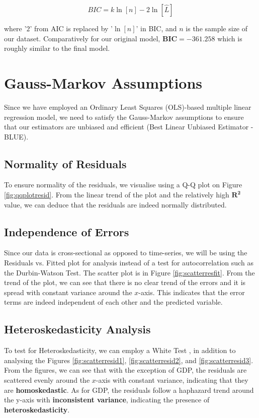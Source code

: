 \documentclass{article}
\begin{document}
\begin{equation}
    BIC = k\ln{[n]} - 2\ln{[\hat{L}]}
\end{equation}

\noindent where '$2$' from AIC is replaced by '$\ln{[n]}$' in BIC, and $n$ is the sample size of our dataset. Comparatively for our original model, $\bm{BIC} = -361.258$ which is roughly similar to the final model.  

\section{Gauss-Markov Assumptions}
Since we have employed an Ordinary Least Squares (OLS)-based multiple linear regression model, we need to satisfy the Gauss-Markov assumptions \cite{GaussMarkov} to ensure that our estimators are unbiased and efficient (Best Linear Unbiased Estimator - BLUE).

\subsection{Normality of Residuals}
To ensure normality of the residuals, we visualise using a Q-Q plot on Figure \ref{fig:qqplotresid}. From the linear trend of the plot and the relatively high $\bm{R^2}$ value, we can deduce that the residuals are indeed normally distributed.

\subsection{Independence of Errors}
Since our data is cross-sectional as opposed to time-series, we will be using the Residuals vs. Fitted plot for analysis instead of a test for autocorrelation such as the Durbin-Watson Test. The scatter plot is in Figure \ref{fig:scatterresfit}. From the trend of the plot, we can see that there is no clear trend of the errors and it is spread with constant variance around the $x$-axis. This indicates that the error terms are indeed independent of each other and the predicted variable.

\subsection{Heteroskedasticity Analysis}\label{Hetero}
To test for Heteroskedasticity, we can employ a White Test \cite{heteroskedasticity}, in addition to analysing the Figures \ref{fig:scatterresid1}, \ref{fig:scatterresid2}, and \ref{fig:scatterresid3}. From the figures, we can see that with the exception of GDP, the residuals are scattered evenly around the $x$-axis with constant variance, indicating that they are \textbf{homoskedastic}. As for GDP, the residuals follow a haphazard trend around the y-axis with \textbf{inconsistent variance}, indicating the presence of \textbf{heteroskedasticity}. 
\end{document}
